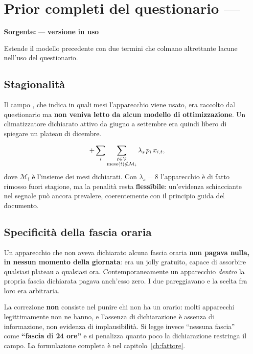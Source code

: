 \section{Prior completi del questionario --- }
\label{sec:m6}

\noindent\textbf{Sorgente:}  --- \textbf{versione in uso}

Estende il modello precedente con due termini che colmano altrettante lacune nell'uso del
questionario.

\subsection*{Stagionalità}

Il campo , che indica in quali mesi l'apparecchio viene usato, era raccolto
dal questionario ma \textbf{non veniva letto da alcun modello di ottimizzazione}. Un
climatizzatore dichiarato attivo da giugno a settembre era quindi libero di spiegare un plateau di
dicembre.

\begin{equation}
  + \sum_{i} \sum_{\substack{t \in \mathcal{V} \\ \text{mese}(t) \notin \mathcal{M}_i}}
    \lambda_s \, p_i \, x_{i,t} ,
  \label{eq:stagione}
\end{equation}
dove $\mathcal{M}_i$ è l'insieme dei mesi dichiarati. Con $\lambda_s = 8$ l'apparecchio è di fatto
rimosso fuori stagione, ma la penalità resta \textbf{flessibile}: un'evidenza schiacciante nel
segnale può ancora prevalere, coerentemente con il principio guida del documento.

\subsection*{Specificità della fascia oraria}

Un apparecchio che non aveva dichiarato alcuna fascia oraria \textbf{non pagava nulla, in nessun
momento della giornata}: era un jolly gratuito, capace di assorbire qualsiasi plateau a
qualsiasi ora. Contemporaneamente un apparecchio \emph{dentro} la propria fascia dichiarata pagava
anch'esso zero. I due pareggiavano e la scelta fra loro era arbitraria.

La correzione \textbf{non} consiste nel punire chi non ha un orario: molti apparecchi
legittimamente non ne hanno, e l'assenza di dichiarazione è assenza di informazione, non evidenza
di implausibilità. Si legge invece ``nessuna fascia'' come \textbf{``fascia di 24 ore''} e si
penalizza quanto poco la dichiarazione restringa il campo. La formulazione completa è nel
capitolo~\ref{ch:fattore}.

